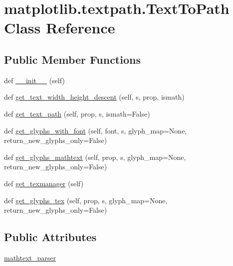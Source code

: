 \hypertarget{classmatplotlib_1_1textpath_1_1TextToPath}{}\section{matplotlib.\+textpath.\+Text\+To\+Path Class Reference}
\label{classmatplotlib_1_1textpath_1_1TextToPath}
\subsection*{Public Member Functions}
\begin{DoxyCompactItemize}
\item 
def \hyperlink{classmatplotlib_1_1textpath_1_1TextToPath_ac3e70a80d9af89b4057849972986acbf}{\+\_\+\+\_\+init\+\_\+\+\_\+} (self)
\item 
def \hyperlink{classmatplotlib_1_1textpath_1_1TextToPath_a2ec9058db45d1dbf46afefff1b516a38}{get\+\_\+text\+\_\+width\+\_\+height\+\_\+descent} (self, s, prop, ismath)
\item 
def \hyperlink{classmatplotlib_1_1textpath_1_1TextToPath_a3a70c03f1989796c5656f19ad99bf2bb}{get\+\_\+text\+\_\+path} (self, prop, s, ismath=False)
\item 
def \hyperlink{classmatplotlib_1_1textpath_1_1TextToPath_a24979a16a01326cc459e5896af04789c}{get\+\_\+glyphs\+\_\+with\+\_\+font} (self, font, s, glyph\+\_\+map=None, return\+\_\+new\+\_\+glyphs\+\_\+only=False)
\item 
def \hyperlink{classmatplotlib_1_1textpath_1_1TextToPath_ac47cf73d08b9218838f35ca935db1949}{get\+\_\+glyphs\+\_\+mathtext} (self, prop, s, glyph\+\_\+map=None, return\+\_\+new\+\_\+glyphs\+\_\+only=False)
\item 
def \hyperlink{classmatplotlib_1_1textpath_1_1TextToPath_a7ed67143c6f1f42106fc5c29adf4b8a7}{get\+\_\+texmanager} (self)
\item 
def \hyperlink{classmatplotlib_1_1textpath_1_1TextToPath_a392bb2358484531bbaf91bb5cddd9a7d}{get\+\_\+glyphs\+\_\+tex} (self, prop, s, glyph\+\_\+map=None, return\+\_\+new\+\_\+glyphs\+\_\+only=False)
\end{DoxyCompactItemize}
\subsection*{Public Attributes}
\begin{DoxyCompactItemize}
\item 
\hyperlink{classmatplotlib_1_1textpath_1_1TextToPath_a14eac8e49ef9555f674bc8442044f8ac}{mathtext\+\_\+parser}
\end{DoxyCompactItemize}
